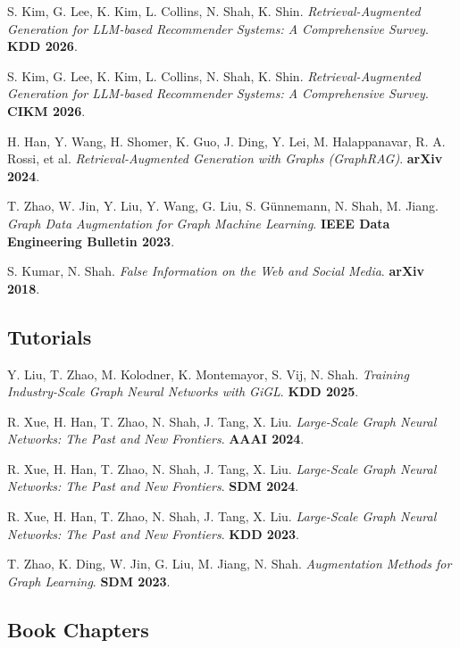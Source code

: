\documentclass{article}
\begin{document}
\begin{etaremune}[itemsep=1pt,parsep=0pt]
\item S. Kim, G. Lee, K. Kim, L. Collins, N. Shah, K. Shin. \emph{Retrieval-Augmented Generation for LLM-based Recommender Systems: A Comprehensive Survey}. \textbf{KDD 2026}.
\item S. Kim, G. Lee, K. Kim, L. Collins, N. Shah, K. Shin. \emph{Retrieval-Augmented Generation for LLM-based Recommender Systems: A Comprehensive Survey}. \textbf{CIKM 2026}.
\item H. Han, Y. Wang, H. Shomer, K. Guo, J. Ding, Y. Lei, M. Halappanavar, R. A. Rossi, et al. \emph{Retrieval-Augmented Generation with Graphs (GraphRAG)}. \textbf{arXiv 2024}.
\item T. Zhao, W. Jin, Y. Liu, Y. Wang, G. Liu, S. Günnemann, N. Shah, M. Jiang. \emph{Graph Data Augmentation for Graph Machine Learning}. \textbf{IEEE Data Engineering Bulletin 2023}.
\item S. Kumar, N. Shah. \emph{False Information on the Web and Social Media}. \textbf{arXiv 2018}.
\end{etaremune}

\subsection*{\bf {Tutorials}}

\begin{etaremune}[itemsep=1pt,parsep=0pt]
\item Y. Liu, T. Zhao, M. Kolodner, K. Montemayor, S. Vij, N. Shah. \emph{Training Industry-Scale Graph Neural Networks with GiGL}. \textbf{KDD 2025}.
\item R. Xue, H. Han, T. Zhao, N. Shah, J. Tang, X. Liu. \emph{Large-Scale Graph Neural Networks: The Past and New Frontiers}. \textbf{AAAI 2024}.
\item R. Xue, H. Han, T. Zhao, N. Shah, J. Tang, X. Liu. \emph{Large-Scale Graph Neural Networks: The Past and New Frontiers}. \textbf{SDM 2024}.
\item R. Xue, H. Han, T. Zhao, N. Shah, J. Tang, X. Liu. \emph{Large-Scale Graph Neural Networks: The Past and New Frontiers}. \textbf{KDD 2023}.
\item T. Zhao, K. Ding, W. Jin, G. Liu, M. Jiang, N. Shah. \emph{Augmentation Methods for Graph Learning}. \textbf{SDM 2023}.
\end{etaremune}

\subsection*{\bf {Book Chapters}}
\end{document}
